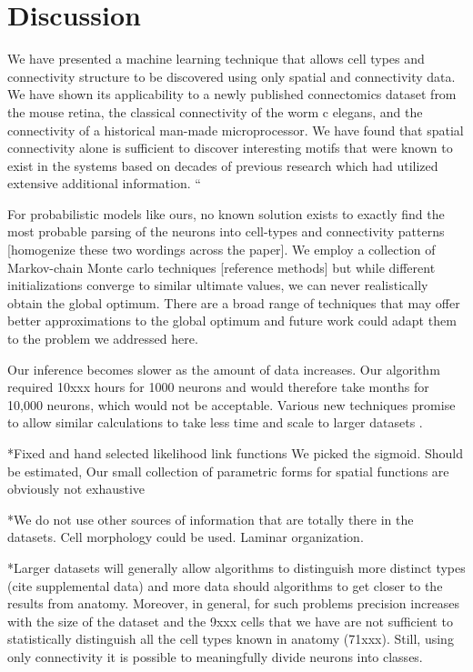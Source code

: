 \documentclass{article}
\begin{document}
\section{Discussion}
We have presented a machine learning technique that allows cell types
and connectivity structure to be discovered using only spatial and
connectivity data. We have shown its applicability to a newly
published connectomics dataset from the mouse retina, the classical
connectivity of the worm c elegans, and the connectivity of a
historical man-made microprocessor. We have found that spatial
connectivity alone is sufficient to discover interesting motifs that
were known to exist in the systems based on decades of previous
research which had utilized extensive additional information. “

For probabilistic models like ours, no known solution exists to
exactly find the most probable parsing of the neurons into cell-types
and connectivity patterns [homogenize these two wordings across the
paper]. We employ a collection of Markov-chain Monte carlo techniques
[reference methods] but while different initializations converge to
similar ultimate values, we can never realistically obtain the global
optimum. There are a broad range of techniques that may offer better
approximations to the global optimum \autocite{Wanga2012,FritzJonathan} and future work could
adapt them to the problem we addressed here.

Our inference becomes slower as the amount of data increases. Our
algorithm required 10xxx hours for 1000 neurons and would therefore
take months for 10,000 neurons, which would not be acceptable. Various
new techniques promise to allow similar calculations to take less time
and scale to larger datasets \autocite{}.


*Fixed and hand selected likelihood link functions We picked the
sigmoid. Should be estimated, Our small collection of parametric forms
for spatial functions are obviously not exhaustive

*We do not use other sources of information that are totally there in
the datasets. Cell morphology could be used. Laminar organization.

*Larger datasets will generally allow algorithms to distinguish more
distinct types (cite supplemental data) and more data should
algorithms to get closer to the results from anatomy. Moreover, in
general, for such problems precision increases with the size of the
dataset and the 9xxx cells that we have are not sufficient to
statistically distinguish all the cell types known in anatomy
(71xxx). Still, using only connectivity it is possible to meaningfully
divide neurons into classes.
\end{document}
